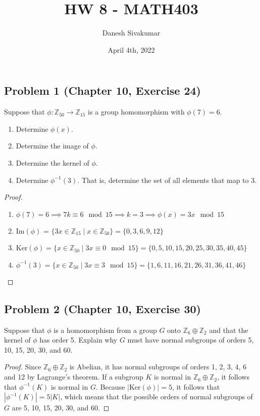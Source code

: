 \documentclass{article}
\title{HW 8 - MATH403}
\author{Danesh Sivakumar}
\date{April 4th, 2022}
\begin{document}
\maketitle 

\subsection*{Problem 1 (Chapter 10, Exercise 24)}
Suppose that $\phi \colon \mathbb{Z}_{50} \to \mathbb{Z}_{15}$ is a group homomorphism with $\phi(7) = 6$.
\begin{enumerate}[label=\alph*.]
    \item Determine $\phi(x)$.
    \item Determine the image of $\phi$.
    \item Determine the kernel of $\phi$.
    \item Determine $\phi^{-1}(3)$. That is, determine the set of all elements that map to 3.
\end{enumerate}

\begin{proof}
\qquad
\begin{enumerate}[label=\alph*.]
    \item $\phi(7) = 6 \implies 7k \equiv 6 \mod 15 \implies k = 3 \implies \phi(x) = 3x \mod 15$
    \item Im$(\phi)$ = $\{3x \in \mathbb{Z}_{15} \mid x \in \mathbb{Z}_{50}\} = \{0, 3, 6, 9, 12\}$
    \item Ker$(\phi) = \{x \in \mathbb{Z}_{50} \mid 3x \equiv 0 \mod 15\} = \{0, 5, 10, 15, 20, 25, 30, 35, 40, 45\}$
    \item $\phi^{-1}(3) = \{x \in \mathbb{Z}_{50} \mid 3x \equiv 3 \mod 15\} = \{1, 6, 11, 16, 21, 26, 31, 36, 41, 46\}$
\end{enumerate}
\end{proof}


\subsection*{Problem 2 (Chapter 10, Exercise 30)}
Suppose that $\phi$ is a homomorphism from a group $G$ onto $\mathbb{Z}_6 \oplus \mathbb{Z}_2$ and that the kernel of $\phi$ has order 5. Explain why $G$ must have normal subgroups of orders 5, 10, 15, 20, 30, and 60.

\begin{proof}
Since $\mathbb{Z}_6 \oplus \mathbb{Z}_2$ is Abelian, it has normal subgroups of orders 1, 2, 3, 4, 6 and 12 by Lagrange's theorem. If a subgroup $K$ is normal in $\mathbb{Z}_6 \oplus \mathbb{Z}_2$, it follows that $\phi^{-1}(K)$ is normal in $G$. Because $|\text{Ker}(\phi)| = 5$, it follows that $|\phi^{-1}(K)| = 5|K|$, which means that the possible orders of normal subgroups of $G$ are 5, 10, 15, 20, 30, and 60.
\end{proof}
\end{document}
